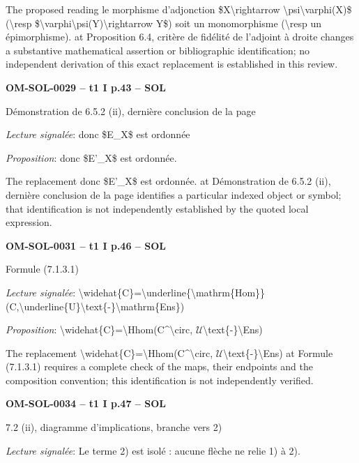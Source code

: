 The proposed reading le morphisme d'adjonction \$X\textbackslash{}rightarrow \textbackslash{}psi\textbackslash{}varphi(X)\$ (\textbackslash{}resp \$\textbackslash{}varphi\textbackslash{}psi(Y)\textbackslash{}rightarrow Y\$) soit un monomorphisme (\textbackslash{}resp un épimorphisme). at Proposition 6.4, critère de fidélité de l'adjoint à droite changes a substantive mathematical assertion or bibliographic identification; no independent derivation of this exact replacement is established in this review.\par
\par\noindent\textbf{OM-SOL-0029 -- t1 I p.43 -- SOL}\par
Démonstration de 6.5.2 (ii), dernière conclusion de la page\par
\emph{Lecture signalée}: donc \$E\_X\$ est ordonnée\par
\emph{Proposition}: donc \$E'\_X\$ est ordonnée.\par
The replacement donc \$E'\_X\$ est ordonnée. at Démonstration de 6.5.2 (ii), dernière conclusion de la page identifies a particular indexed object or symbol; that identification is not independently established by the quoted local expression.\par
\par\noindent\textbf{OM-SOL-0031 -- t1 I p.46 -- SOL}\par
Formule (7.1.3.1)\par
\emph{Lecture signalée}: \textbackslash{}widehat\{C\}=\allowbreak \textbackslash{}underline\{\textbackslash{}mathrm\{Hom\}\}(C,\textbackslash{}underline\{U\}\textbackslash{}text\{-\}\textbackslash{}mathrm\{Ens\})\par
\emph{Proposition}: \textbackslash{}widehat\{C\}=\allowbreak \textbackslash{}Hhom(C\textasciicircum{}\textbackslash{}circ, \ensuremath{𝒰}\textbackslash{}text\{-\}\textbackslash{}Ens)\par
The replacement \textbackslash{}widehat\{C\}=\allowbreak \textbackslash{}Hhom(C\textasciicircum{}\textbackslash{}circ, \ensuremath{𝒰}\textbackslash{}text\{-\}\textbackslash{}Ens) at Formule (7.1.3.1) requires a complete check of the maps, their endpoints and the composition convention; this identification is not independently verified.\par
\par\noindent\textbf{OM-SOL-0034 -- t1 I p.47 -- SOL}\par
7.2 (ii), diagramme d'implications, branche vers 2)\par
\emph{Lecture signalée}: Le terme 2) est isolé : aucune flèche ne relie 1) à 2).\par

